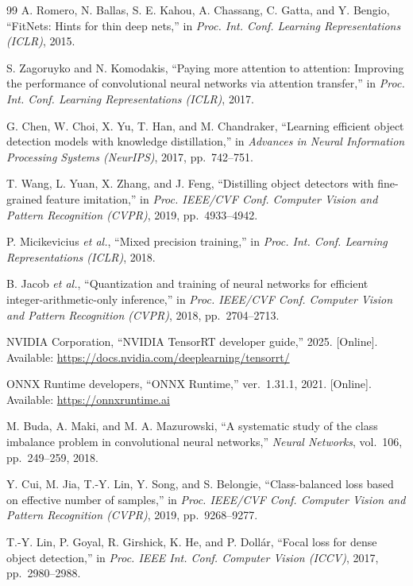 \begin{thebibliography}{99}
A. Romero, N. Ballas, S. E. Kahou, A. Chassang, C. Gatta, and Y. Bengio,
``FitNets: Hints for thin deep nets,''
in \emph{Proc. Int. Conf. Learning Representations (ICLR)}, 2015.

S. Zagoruyko and N. Komodakis,
``Paying more attention to attention: Improving the performance of convolutional neural networks via attention transfer,''
in \emph{Proc. Int. Conf. Learning Representations (ICLR)}, 2017.

G. Chen, W. Choi, X. Yu, T. Han, and M. Chandraker,
``Learning efficient object detection models with knowledge distillation,''
in \emph{Advances in Neural Information Processing Systems (NeurIPS)}, 2017, pp.~742--751.

T. Wang, L. Yuan, X. Zhang, and J. Feng,
``Distilling object detectors with fine-grained feature imitation,''
in \emph{Proc. IEEE/CVF Conf. Computer Vision and Pattern Recognition (CVPR)}, 2019, pp.~4933--4942.

P. Micikevicius \emph{et al.},
``Mixed precision training,''
in \emph{Proc. Int. Conf. Learning Representations (ICLR)}, 2018.

B. Jacob \emph{et al.},
``Quantization and training of neural networks for efficient integer-arithmetic-only inference,''
in \emph{Proc. IEEE/CVF Conf. Computer Vision and Pattern Recognition (CVPR)}, 2018, pp.~2704--2713.

NVIDIA Corporation,
``NVIDIA TensorRT developer guide,'' 2025. [Online]. Available: \url{https://docs.nvidia.com/deeplearning/tensorrt/}

ONNX Runtime developers,
``ONNX Runtime,'' ver.~1.31.1, 2021. [Online]. Available: \url{https://onnxruntime.ai}

M. Buda, A. Maki, and M. A. Mazurowski,
``A systematic study of the class imbalance problem in convolutional neural networks,''
\emph{Neural Networks}, vol.~106, pp.~249--259, 2018.

Y. Cui, M. Jia, T.-Y. Lin, Y. Song, and S. Belongie,
``Class-balanced loss based on effective number of samples,''
in \emph{Proc. IEEE/CVF Conf. Computer Vision and Pattern Recognition (CVPR)}, 2019, pp.~9268--9277.

T.-Y. Lin, P. Goyal, R. Girshick, K. He, and P. Doll\'ar,
``Focal loss for dense object detection,''
in \emph{Proc. IEEE Int. Conf. Computer Vision (ICCV)}, 2017, pp.~2980--2988.


\end{thebibliography}
